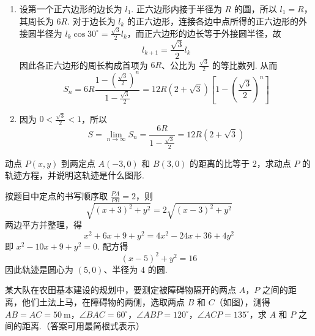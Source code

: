 \begin{solution}
\begin{enumerate}
    \item
    设第一个正六边形的边长为 \(l_1\). 正六边形内接于半径为 \(R\) 的圆，所以 \(l_1=R\)，其周长为 \(6R\). 对于边长为 \(l_k\) 的正六边形，连接各边中点所得的正六边形的外接圆半径为 \(l_k\cos30^\circ=\frac{\sqrt{3}}{2}l_k\)，而正六边形的边长等于外接圆半径，故
\[
l_{k+1}=\frac{\sqrt{3}}{2}l_k
\]
因此各正六边形的周长构成首项为 \(6R\)、公比为 \(\frac{\sqrt{3}}{2}\) 的等比数列. 从而
\[
    S_n=6R\frac{1-\left(\frac{\sqrt{3}}{2}\right)^n}{1-\frac{\sqrt{3}}{2}}=12R\left(2+\sqrt{3}\right)\left[1-\left(\frac{\sqrt{3}}{2}\right)^n\right]
\]

    \item
    因为 \(0<\frac{\sqrt{3}}{2}<1\)，所以
\[
S=\lim_{n\to\infty}S_n=\frac{6R}{1-\frac{\sqrt{3}}{2}}=12R\left(2+\sqrt{3}\right)
\]
\end{enumerate}
\end{solution}

\begin{problem}
动点 \(P(x,y)\) 到两定点 \(A(-3,0)\) 和 \(B(3,0)\) 的距离的比等于 \(2\)，求动点 \(P\) 的轨迹方程，并说明这轨迹是什么图形.
\end{problem}

\begin{solution}
按题目中定点的书写顺序取 \(\frac{PA}{PB}=2\)，则
\[
\sqrt{(x+3)^2+y^2}=2\sqrt{(x-3)^2+y^2}
\]
两边平方并整理，得
\[
x^2+6x+9+y^2=4x^2-24x+36+4y^2
\]
即 \(x^2-10x+9+y^2=0\). 配方得
\[
\left(x-5\right)^2+y^2=16
\]
因此轨迹是圆心为 \((5,0)\)、半径为 \(4\) 的圆.
\end{solution}

\begin{problem}
某大队在农田基本建设的规划中，要测定被障碍物隔开的两点 \(A\)，\(P\) 之间的距离，他们土法上马，在障碍物的两侧，选取两点 \(B\) 和 \(C\)（如图），测得 \(AB=AC=50\mathrm{~m}\)，\(\angle BAC=60^\circ\)，\(\angle ABP=120^\circ\)，\(\angle ACP=135^\circ\)，求 \(A\) 和 \(P\) 之间的距离.（答案可用最简根式表示）

\end{problem}

